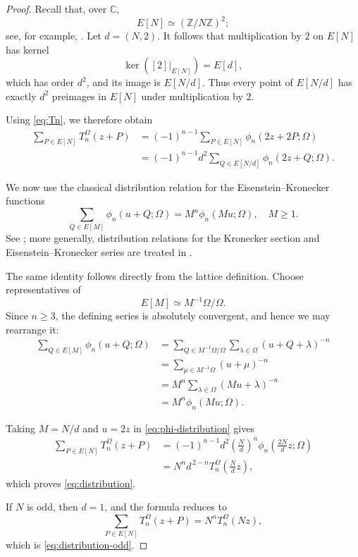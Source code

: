 \documentclass[11pt]{amsart}
\theoremstyle{definition}
\theoremstyle{remark}
\numberwithin{equation}{section}
\begin{document}
\begin{proof}
Recall that, over \(\mathbb C\),
\[
E[N]\simeq (\mathbb Z/N\mathbb Z)^2;
\]
see, for example, \cite[Ch.~II, \S1]{lang}. Let \(d=(N,2)\).
It follows that multiplication by \(2\) on \(E[N]\) has kernel
\[
\ker([2]\vert_{E[N]})=E[d],
\]
which has order \(d^2\), and its image is \(E[N/d]\). Thus every point of
\(E[N/d]\) has exactly \(d^2\) preimages in \(E[N]\) under multiplication
by \(2\).

Using \eqref{eq:Tn}, we therefore obtain
\begin{align*}
\sum_{P\in E[N]}T_n^\Omega(z+P)
&=
(-1)^{n-1}
\sum_{P\in E[N]}
\phi_n(2z+2P;\Omega)\\
&=
(-1)^{n-1}d^2
\sum_{Q\in E[N/d]}
\phi_n(2z+Q;\Omega).
\end{align*}

We now use the classical distribution relation for the
Eisenstein--Kronecker functions
\begin{equation}\label{eq:phi-distribution}
\sum_{Q\in E[M]}
\phi_n(u+Q;\Omega)
=
M^n\phi_n(Mu;\Omega),
\quad M\geq1.
\end{equation}
See \cite{weil}; more generally, distribution relations for the
Kronecker section and Eisenstein--Kronecker series are treated in
\cite[Appendix~A]{sprang}.

The same identity follows directly from the lattice definition. Choose representatives of
\[
E[M]\simeq M^{-1}\Omega/\Omega.
\]
Since \(n\geq3\), the defining series is absolutely convergent, and hence
we may rearrange it:
\begin{align*}
\sum_{Q\in E[M]}\phi_n(u+Q;\Omega)
&=
\sum_{Q\in M^{-1}\Omega/\Omega}
\sum_{\lambda\in\Omega}
(u+Q+\lambda)^{-n}\\
&=
\sum_{\mu\in M^{-1}\Omega}
(u+\mu)^{-n}\\
&=
M^n
\sum_{\lambda\in\Omega}
(Mu+\lambda)^{-n}\\
&=
M^n\phi_n(Mu;\Omega).
\end{align*}

Taking \(M=N/d\) and \(u=2z\) in
\eqref{eq:phi-distribution} gives
\begin{align*}
\sum_{P\in E[N]}T_n^\Omega(z+P)
&=
(-1)^{n-1}d^2
\left(\frac{N}{d}\right)^n
\phi_n\left(\frac{2N}{d}z;\Omega\right)\\
&=
N^n d^{\,2-n}
T_n^\Omega\left(\frac{N}{d}z\right),
\end{align*}
which proves \eqref{eq:distribution}.

If \(N\) is odd, then \(d=1\), and the formula reduces to
\[
\sum_{P\in E[N]}T_n^\Omega(z+P)
=
N^nT_n^\Omega(Nz),
\]
which is \eqref{eq:distribution-odd}.
\end{proof}
\end{document}
